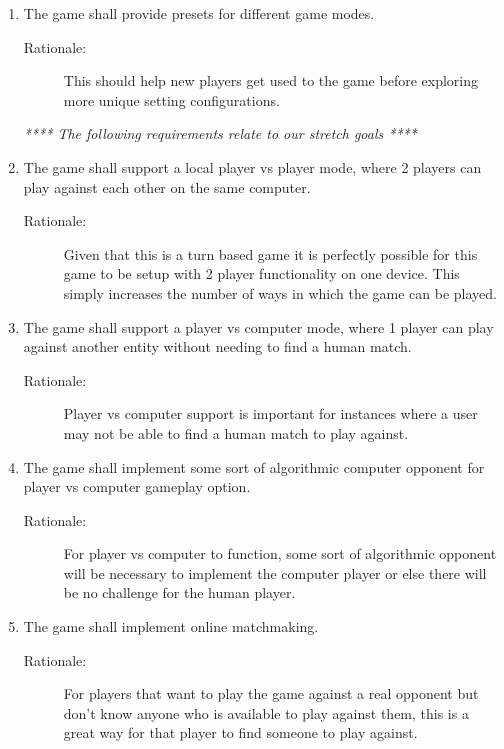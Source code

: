 \begin{enumerate}[label=R\arabic*, start=1, left=0pt]
    \item \label{R10} The game shall provide presets for different game modes.
    \begin{description}
        \item[Rationale:] This should help new players get used to the game before exploring more unique setting configurations.
    \end{description}

    \textit{**** The following requirements relate to our stretch goals ****}
    \item \label{R11} The game shall support a local player vs player mode, where 2 players can play against each other on the same computer.
    \begin{description}
        \item[Rationale:] Given that this is a turn based game it is perfectly possible for this game to be setup with 2 player functionality on one device. This simply increases the number of ways in which the game can be played.
    \end{description}

    \item \label{R12} The game shall support a player vs computer mode, where 1 player can play against another entity without needing to find a human match.
    \begin{description}
        \item[Rationale:] Player vs computer support is important for instances where a user may not be able to find a human match to play against.
    \end{description}

    \item \label{R13} The game shall implement some sort of algorithmic computer opponent for  player vs computer gameplay option.
    \begin{description}
        \item[Rationale:] For player vs computer to function, some sort of algorithmic opponent will be necessary to implement the computer player or else there will be no challenge for the human player.
    \end{description}

    \item \label{R14} The game shall implement online matchmaking.
    \begin{description}
        \item[Rationale:] For players that want to play the game against a real opponent but don't know anyone who is available to play against them, this is a great way for that player to find someone to play against.
    \end{description}


\end{enumerate}
